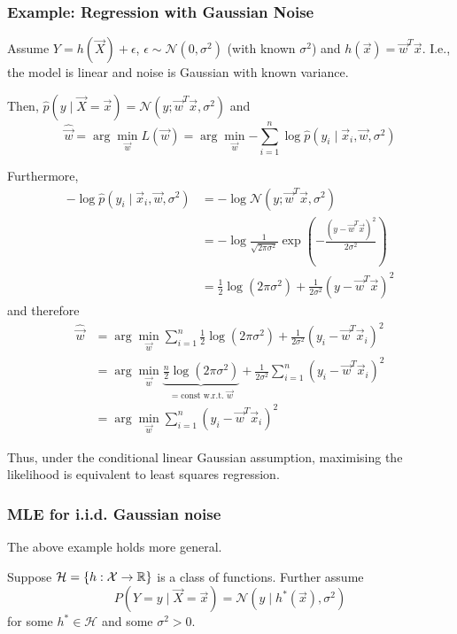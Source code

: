 \subsubsection{Example: Regression with Gaussian Noise}
Assume $Y = h(\vec{X}) + \epsilon$,
$\epsilon \sim \mathcal{N}(0, \sigma^2)$ 
(with known $\sigma^2$) and
$h(\vec{x}) = \vec{w}^T \vec{x}$.
I.e., the model is linear and noise is Gaussian
with known variance.

Then,
$\hat{p}(y \mid \vec{X} = \vec{x}) = \mathcal{N}(y; \vec{w}^T \vec{x}, \sigma^2)$
and
\begin{equation*}
\hat{\vec{w}} = \arg\min_{\vec{w}}{L(\vec{w})}
= \arg\min_{\vec{w}}{
	-\sum_{i=1}^n{\log{\hat{p}(y_i \mid \vec{x}_i, \vec{w}, \sigma^2)}}
}
\end{equation*}

Furthermore,
\begin{align*}
- \log{\hat{p}(y_i \mid \vec{x}_i, \vec{w}, \sigma^2)}
&= -\log{\mathcal{N}(y; \vec{w}^T \vec{x}, \sigma^2)} \\
&= -\log{\frac{1}{\sqrt{2 \pi \sigma^2}} \exp{
		\left( -\frac{(y - \vec{w}^T \vec{x})^2}{2 \sigma^2} \right)
}} \\
&= \frac{1}{2} \log{(2 \pi \sigma^2)} + \frac{1}{2 \sigma^2} (y-\vec{w}^T \vec{x})^2
\end{align*}
and therefore
\begin{align*}
\hat{\vec{w}} &= \arg\min_{\vec{w}}{
	\sum_{i=1}^n{\frac{1}{2} \log{(2 \pi \sigma^2)} + \frac{1}{2 \sigma^2} (y_i-\vec{w}^T \vec{x}_i)^2}
} \\
&= \arg\min_{\vec{w}}{
	\underbrace{\frac{n}{2} \log{(2 \pi \sigma^2)}}_{= \text{const w.r.t. $\vec{w}$}}
	+ \frac{1}{2 \sigma^2} \sum_{i=1}^n{(y_i - \vec{w}^T \vec{x}_i)^2}
} \\
&= \arg\min_{\vec{w}}{\sum_{i=1}^n{(y_i - \vec{w}^T \vec{x}_i)^2}}
\end{align*}

Thus, under the conditional linear Gaussian assumption,
maximising the likelihood is equivalent
to least squares regression.


\subsubsection{MLE for i.i.d. Gaussian noise}
The above example holds more general.

Suppose $\mathcal{H} = \{h : \mathcal{X} \to \mathbb{R}\}$
is a class of functions.
Further assume
\begin{equation*}
P(Y = y \mid \vec{X} = \vec{x}) =
\mathcal{N}(y \mid h^*(\vec{x}), \sigma^2)
\end{equation*}
for some $h^* \in \mathcal{H}$ and some $\sigma^2 > 0$.

